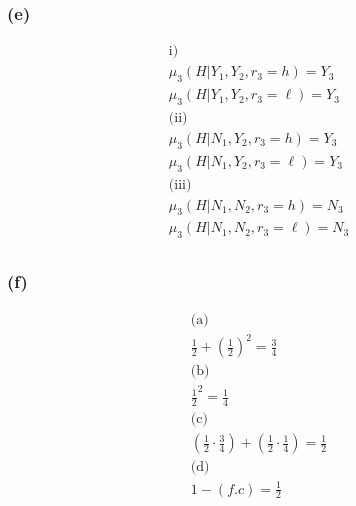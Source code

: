 \documentclass[10pt, a4paper]{article}
\begin{document}
      \subsubsection*{(e)}
        \begin{gather*}
          \text{i)} \\
          \mu_3(H|Y_1,Y_2,r_3=h) = Y_3 \\
          \mu_3(H|Y_1,Y_2,r_3=\ell) = Y_3 \\
          \text{(ii)} \\
          \mu_3(H|N_1,Y_2,r_3=h) = Y_3 \\
          \mu_3(H|N_1,Y_2,r_3=\ell) = Y_3 \\
          \text{(iii)} \\
          \mu_3(H|N_1,N_2,r_3=h) = N_3 \\
          \mu_3(H|N_1,N_2,r_3=\ell) = N_3 \\
        \end{gather*}
      \subsubsection*{(f)}
        \begin{gather*}
          \text{(a)} \\
          \frac{1}{2}+(\frac{1}{2})^2 = \frac{3}{4} \\
          \text{(b)} \\
          \frac{1}{2}^2 = \frac{1}{4} \\
          \text{(c)} \\
          (\frac{1}{2}\cdot\frac{3}{4}) + (\frac{1}{2}\cdot\frac{1}{4}) = \frac{1}{2} \\
          \text{(d)} \\
          1 - (f.c) = \frac{1}{2} \\
        \end{gather*}
\end{document}
